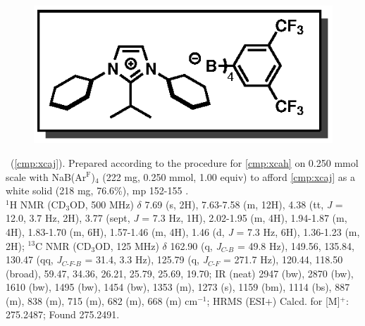 \vspace{10pt}
\begin{figure}
  \vspace{-20pt}
  \begin{center}
    \includegraphics[scale=0.8]{chp_alkylation/images/xcaj}
  \end{center}
  \vspace{-30pt}
\end{figure}
\noindent \textbf{\CMPxcaj}\ (\ref{cmp:xcaj}). Prepared according to the procedure for
\ref{cmp:xcah} on 0.250 mmol scale with NaB(Ar$^\mathrm{F}$)$_4$ (222 mg, 0.250 mmol, 1.00 equiv) to
afford \ref{cmp:xcaj} as a white solid (218 mg, 76.6\%), mp 152-155 \degc.\\
$^1$H NMR (CD$_3$OD, 500 MHz) $\delta$ 7.69 (s, 2H), 7.63-7.58 (m, 12H), 4.38 (tt, \textit{J} =
12.0, 3.7 Hz, 2H), 3.77 (sept, \textit{J} = 7.3 Hz, 1H), 2.02-1.95 (m, 4H), 1.94-1.87 (m, 4H),
1.83-1.70 (m, 6H), 1.57-1.46 (m, 4H), 1.46 (d, \textit{J} = 7.3 Hz, 6H), 1.36-1.23 (m, 2H); $^{13}$C
NMR (CD$_3$OD, 125 MHz) $\delta$ 162.90 (q, \textit{J}$_{C\mbox{-}B}$ = 49.8 Hz), 149.56, 135.84,
130.47 (qq, \textit{J}$_{C\mbox{-}F\mbox{-}B}$ = 31.4, 3.3 Hz), 125.79 (q, \textit{J}$_{C\mbox{-}F}$
= 271.7 Hz), 120.44, 118.50 (broad), 59.47, 34.36, 26.21, 25.79, 25.69, 19.70; IR (neat) 2947 (bw),
2870 (bw), 1610 (bw), 1495 (bw), 1454 (bw), 1353 (m), 1273 (s), 1159 (bm), 1114 (bs), 887 (m), 838 (m), 715 (m), 682 (m), 668 (m) cm$^{-1}$; HRMS (ESI+) Calcd. for  [M]$^+$:
275.2487; Found 275.2491.

